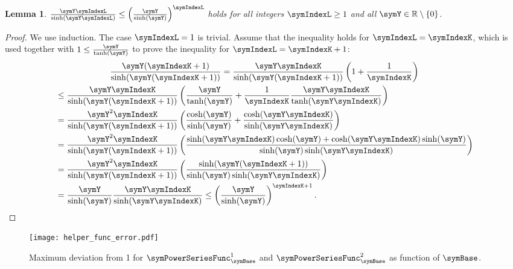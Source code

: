 \documentclass[sigconf, nonacm]{acmart}
\newtheorem{lemma}{Lemma}
\begin{document}
\begin{lemma}
\label{lemma:inquality_sinh}
$\frac{\symY\symIndexL}{\sinh(\symY\symIndexL)}\leq\left(\frac{\symY}{\sinh(\symY)}\right)^\symIndexL$ holds for all integers $\symIndexL \geq 1$ and all $\symY\in\mathbb{R}\setminus\lbrace 0\rbrace$.
\end{lemma}
\begin{proof}
We use induction. The case $\symIndexL=1$ is trivial. Assume that the inequality holds for $\symIndexL=\symIndexK$, which is used together with $1\leq\frac{\symY}{\tanh(\symY)}$ to prove the inequality for $\symIndexL = \symIndexK+1$:
\begin{multline*}
\frac{\symY(\symIndexK+1)}{\sinh(\symY(\symIndexK+1))}
=
\frac{\symY\symIndexK}{\sinh(\symY(\symIndexK+1))}
\left(
1
+
\frac{1}{\symIndexK}
\right)
\\
\begin{aligned}
&\leq
\frac{\symY\symIndexK}{\sinh(\symY(\symIndexK+1))}
\left(
\frac{\symY}{\tanh(\symY)} + \frac{1}{\symIndexK}\frac{\symY\symIndexK}{\tanh(\symY\symIndexK)}
\right)
\\
&=
\frac{\symY^2\symIndexK}{\sinh(\symY(\symIndexK+1))}
\left(
\frac{\cosh(\symY)}{\sinh(\symY)} + \frac{\cosh(\symY\symIndexK)}{\sinh(\symY\symIndexK)}
\right)
\\
&=
\frac{\symY^2\symIndexK}{\sinh(\symY(\symIndexK+1))}
\left(
\frac{\sinh(\symY\symIndexK)\cosh(\symY)+\cosh(\symY\symIndexK)\sinh(\symY)}{\sinh(\symY)\sinh(\symY\symIndexK)}
\right)
\\
&=
\frac{\symY^2\symIndexK}{\sinh(\symY(\symIndexK+1))}
\left(
\frac{\sinh(\symY(\symIndexK+1))}{\sinh(\symY)\sinh(\symY\symIndexK)}
\right)
\\
&=
\frac{\symY}{\sinh(\symY)}
\frac{\symY\symIndexK}{\sinh(\symY\symIndexK)}
\leq
\left(\frac{\symY}{\sinh(\symY)}\right)^{\symIndexK+1}.
\end{aligned}
\end{multline*}
\end{proof}

\begin{figure}
  \centering
  \texttt{[image: helper\_func\_error.pdf]}
  \caption{\boldmath Maximum deviation from 1 for $\symPowerSeriesFunc_\symBase^1$ and $\symPowerSeriesFunc_\symBase^2$ as function of $\symBase$.}
  \label{fig:helper_func_error}
\end{figure}
\end{document}
